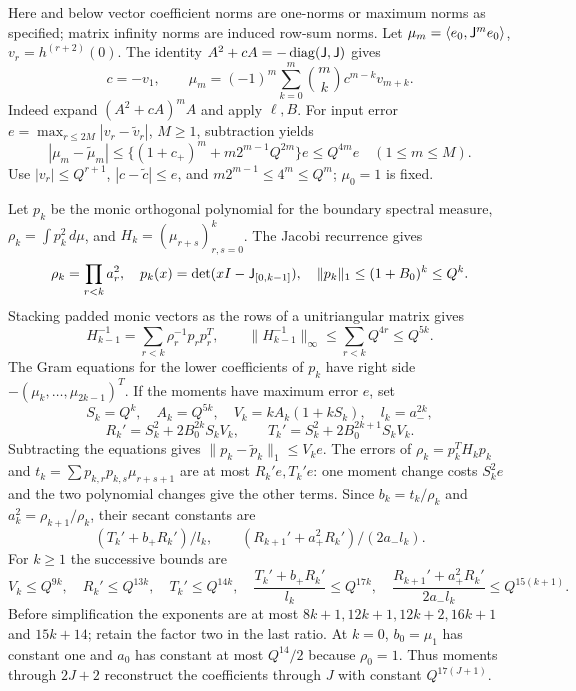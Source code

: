 Here and below vector coefficient norms are one-norms or maximum norms as
specified; matrix infinity norms are induced row-sum norms. Let
$\mu_m=\langle e_0,\mathsf J^m e_0\rangle$, $v_r=h^{(r+2)}(0)$.
The identity $A^2+cA=-\operatorname{diag}(\mathsf J,\mathsf J)$ gives
\begin{equation}
 c=-v_1,\qquad
 \mu_m=(-1)^m\sum_{k=0}^m\binom mk c^{m-k}v_{m+k}.
 \label{eq:moment}
\end{equation}
Indeed expand $(A^2+cA)^m A$ and apply $\ell,B$. For input error
$e=\max_{r\le2M}|v_r-\widetilde v_r|$, $M\ge1$, subtraction yields
\[
 |\mu_m-\widetilde\mu_m|
 \le\{(1+c_+)^m+m2^{m-1}Q^{2m}\}e\le Q^{4m}e\quad(1\le m\le M).
\]
Use $|v_r|\le Q^{r+1}$, $|c-\widetilde c|\le e$, and
$m2^{m-1}\le4^m\le Q^m$; $\mu_0=1$ is fixed.

Let $p_k$ be the monic orthogonal polynomial for the boundary spectral measure,
$\rho_k=\int p_k^2\,d\mu$, and $H_k=(\mu_{r+s})_{r,s=0}^k$.
The Jacobi recurrence gives
\[
 \rho_k=\prod_{r<k}a_r^2,\quad
 p_k(x)=\det(xI-\mathsf J_{[0,k-1]}),\quad \|p_k\|_1\le(1+B_0)^k\le Q^k.
\]
Stacking padded monic vectors as the rows of a unitriangular matrix gives
\begin{equation}
 H_{k-1}^{-1}=\sum_{r<k}\rho_r^{-1}p_rp_r^T,\qquad
 \|H_{k-1}^{-1}\|_\infty\le\sum_{r<k}Q^{4r}\le Q^{5k}.
 \label{eq:gram}
\end{equation}
The Gram equations for the lower coefficients of $p_k$ have right side
$-(\mu_k,\ldots,\mu_{2k-1})^T$. If the moments have maximum error $e$, set
\[
 S_k=Q^k,\quad A_k=Q^{5k},\quad V_k=kA_k(1+kS_k),\quad l_k=a_-^{2k},
\]
\[
 R_k'=S_k^2+2B_0^{2k}S_kV_k,\qquad T_k'=S_k^2+2B_0^{2k+1}S_kV_k.
\]
Subtracting the equations gives $\|p_k-\widetilde p_k\|_1\le V_ke$.
The errors of $\rho_k=p_k^TH_kp_k$ and
$t_k=\sum p_{k,r}p_{k,s}\mu_{r+s+1}$ are at most $R_k'e,T_k'e$:
one moment change costs $S_k^2e$ and the two polynomial changes give the
other terms. Since $b_k=t_k/\rho_k$ and $a_k^2=\rho_{k+1}/\rho_k$, their
secant constants are
\[
 (T_k'+b_+R_k')/l_k,\qquad
 (R_{k+1}'+a_+^2R_k')/(2a_-l_k).
\]
For $k\ge1$ the successive bounds are
\[
 V_k\le Q^{9k},\quad R_k'\le Q^{13k},\quad T_k'\le Q^{14k},\quad
 \frac{T_k'+b_+R_k'}{l_k}\le Q^{17k},\quad
 \frac{R_{k+1}'+a_+^2R_k'}{2a_-l_k}\le Q^{15(k+1)}.
\]
Before simplification the exponents are at most $8k+1,12k+1,12k+2,16k+1$
and $15k+14$; retain the factor two in the last ratio. At $k=0$, $b_0=\mu_1$
has constant one and $a_0$ has constant at most $Q^{14}/2$ because $\rho_0=1$.
Thus moments through $2J+2$ reconstruct the coefficients through $J$ with
constant $Q^{17(J+1)}$.

